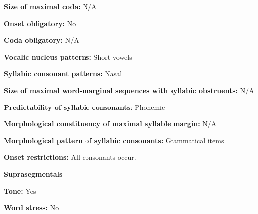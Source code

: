 \begin{styleBody}
\textbf{Size of maximal coda:} N/A
\end{styleBody}

\begin{styleBody}
\textbf{Onset obligatory:} No
\end{styleBody}

\begin{styleBody}
\textbf{Coda obligatory:} N/A
\end{styleBody}

\begin{styleBody}
\textbf{Vocalic nucleus patterns:} Short vowels
\end{styleBody}

\begin{styleBody}
\textbf{Syllabic consonant patterns:} Nasal
\end{styleBody}

\begin{styleBody}
\textbf{Size of maximal word{}-marginal sequences with syllabic obstruents:} N/A
\end{styleBody}

\begin{styleBody}
\textbf{Predictability of syllabic consonants:} Phonemic
\end{styleBody}

\begin{styleBody}
\textbf{Morphological constituency of maximal syllable margin:} N/A
\end{styleBody}

\begin{styleBody}
\textbf{Morphological pattern of syllabic consonants:} Grammatical items
\end{styleBody}

\begin{styleBody}
\textbf{Onset restrictions: }All consonants occur.
\end{styleBody}

\begin{styleBody}
\textbf{Suprasegmentals}
\end{styleBody}

\begin{styleBody}
\textbf{Tone: }Yes
\end{styleBody}

\begin{styleBody}
\textbf{Word stress:} No
\end{styleBody}

